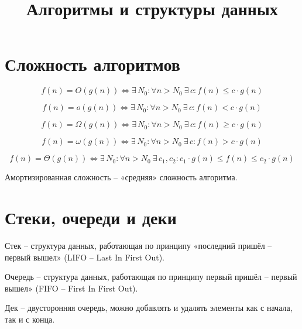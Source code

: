 \documentclass[12pt]{article}
\title{\textbf{Алгоритмы и структуры данных}}\date{}\author{}
\begin{document}
\maketitle
\tableofcontents
\label{toc}
\newpage

\section{Сложность алгоритмов}

\begin{definition}
	\[f(n)=O(g(n))\iff \exists\,N_0\colon \forall
	n>N_0\ \exists\,c\colon f(n)\leqslant c\cdot g(n)\]
\end{definition}
\begin{definition}
	\[f(n)=o(g(n))\iff \exists\,N_0\colon \forall
	n>N_0\ \exists\,c\colon f(n)< c\cdot g(n)\]
\end{definition}
\begin{definition}
	\[f(n)=\Omega(g(n))\iff \exists\,N_0\colon \forall
	n>N_0\ \exists\,c\colon f(n)\geqslant c\cdot g(n)\]
\end{definition}
\begin{definition}
	\[f(n)=\omega(g(n))\iff \exists\,N_0\colon \forall
	n>N_0\ \exists\,c\colon f(n)> c\cdot g(n)\]
\end{definition}
\begin{definition}
	\[f(n)=\Theta(g(n))\iff \exists\,N_0\colon \forall
		n>N_0\ \exists\,c_1, c_2\colon c_1\cdot g(n)\leqslant f(n)\leqslant
	c_2\cdot g(n)\]
\end{definition}
\begin{definition}
	Амортизированная сложность -- «средняя» сложность алгоритма.
\end{definition}

\section{Стеки, очереди и деки}

\begin{definition}
	Стек -- структура данных, работающая по принципу «последний пришёл
	-- первый вышел» (LIFO -- Last In First Out).
\end{definition}
\begin{definition}
	Очередь -- структура данных, работающая по принципу первый пришёл
	-- первый вышел» (FIFO -- First In First Out).
\end{definition}
\begin{definition}
	Дек -- двусторонняя очередь, можно добавлять и удалять элементы
	как с начала, так и с конца.
\end{definition}
\end{document}
